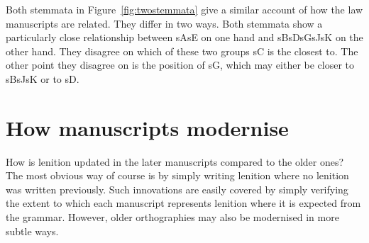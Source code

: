 Both stemmata in Figure~\ref{fig:twostemmata} give a similar account of how the law manuscripts are related. They differ in two ways. Both stemmata show a particularly close relationship between \gls{sA}\gls{sE} on one hand and \gls{sB}\gls{sD}\gls{sG}\gls{sJ}\gls{sK} on the other hand. They disagree on which of these two groups \gls{sC} is the closest to. The other point they disagree on is the position of \gls{sG}, which may either be closer to \gls{sB}\gls{sJ}\gls{sK} or to \gls{sD}.
  


\section{How manuscripts modernise}
\label{sec:how-do-manuscripts}

How is lenition updated in the later manuscripts compared to the older ones?
The most obvious way of course is by simply writing lenition where no lenition was written previously. Such innovations are easily covered by simply verifying the extent to which each manuscript represents lenition where it is expected from the grammar. However, older orthographies may also be modernised in more subtle ways.

